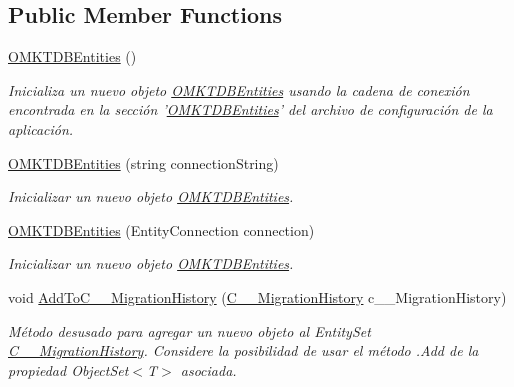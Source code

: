 \subsection*{Public Member Functions}
\begin{DoxyCompactItemize}
\item 
\hyperlink{class_game_memory_1_1_o_m_k_t_d_b_entities_a0aafc6eff88094ee3298696afb1f379a}{O\-M\-K\-T\-D\-B\-Entities} ()
\begin{DoxyCompactList}\small\item\em Inicializa un nuevo objeto \hyperlink{class_game_memory_1_1_o_m_k_t_d_b_entities}{O\-M\-K\-T\-D\-B\-Entities} usando la cadena de conexión encontrada en la sección '\hyperlink{class_game_memory_1_1_o_m_k_t_d_b_entities}{O\-M\-K\-T\-D\-B\-Entities}' del archivo de configuración de la aplicación. \end{DoxyCompactList}\item 
\hyperlink{class_game_memory_1_1_o_m_k_t_d_b_entities_a176e56526c22b56f058e0e5558003549}{O\-M\-K\-T\-D\-B\-Entities} (string connection\-String)
\begin{DoxyCompactList}\small\item\em Inicializar un nuevo objeto \hyperlink{class_game_memory_1_1_o_m_k_t_d_b_entities}{O\-M\-K\-T\-D\-B\-Entities}. \end{DoxyCompactList}\item 
\hyperlink{class_game_memory_1_1_o_m_k_t_d_b_entities_a402c8c5e03fbf49df4efc864096c7de9}{O\-M\-K\-T\-D\-B\-Entities} (Entity\-Connection connection)
\begin{DoxyCompactList}\small\item\em Inicializar un nuevo objeto \hyperlink{class_game_memory_1_1_o_m_k_t_d_b_entities}{O\-M\-K\-T\-D\-B\-Entities}. \end{DoxyCompactList}\item 
void \hyperlink{class_game_memory_1_1_o_m_k_t_d_b_entities_a61799ab7889066b0cb44d3e67d25a7ee}{Add\-To\-C\-\_\-\-\_\-\-Migration\-History} (\hyperlink{class_game_memory_1_1_c_____migration_history}{C\-\_\-\-\_\-\-Migration\-History} c\-\_\-\-\_\-\-Migration\-History)
\begin{DoxyCompactList}\small\item\em Método desusado para agregar un nuevo objeto al Entity\-Set \hyperlink{class_game_memory_1_1_c_____migration_history}{C\-\_\-\-\_\-\-Migration\-History}. Considere la posibilidad de usar el método .Add de la propiedad Object\-Set$<$T$>$ asociada. \end{DoxyCompactList}\item 

\end{DoxyCompactItemize}
